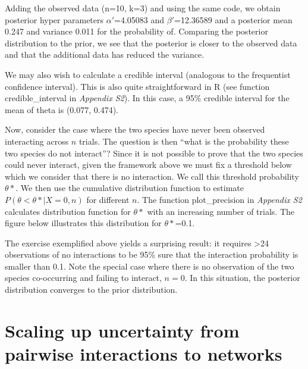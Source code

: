 \documentclass[12pt]{article}
\begin{document}
    Adding the observed data (n=10, k=3) and using the same code,
    we obtain posterior hyper parameters $\alpha'$=4.05083 and $\beta'$=12.36589 and a posterior mean 0.247 and variance 0.011 for the probability of. Comparing the posterior distribution to the prior, we see that the posterior is closer to the observed data and that the additional data has reduced the variance.


    We may also wish to calculate a credible interval (analogous to the frequentist confidence interval). This is also quite straightforward in R (see function credible\_interval in \emph{Appendix S2}). In this case, a 95\% credible interval for the mean of theta is (0.077, 0.474).


    Now, consider the case where the two species have never been observed interacting across $n$ trials. The question is then ``what is the probability these two species do not interact''? Since it is not possible to prove that the two species could never interact, given the framework above we must fix a threshold below which we consider that there is no interaction. We call this threshold probability $\theta*$. We then use the cumulative distribution function to estimate $P(\theta<\theta*|X=0,n)$ for different $n$. The 
    function plot\_precision in \emph{Appendix S2} calculates distribution function for $\theta*$ with an increasing number of trials. The figure below illustrates this distribution for $\theta*$=0.1.


    The exercise exemplified above yields a surprising result: it requires \textgreater24 observations of no interactions to be 95\% sure that the interaction probability is smaller than 0.1. Note the special case where there is no observation of the two species co-occurring and failing to interact, $n = 0$. In this situation, the posterior distribution converges to the prior distribution. 


\section*{Scaling up uncertainty from pairwise interactions to networks}
\end{document}
